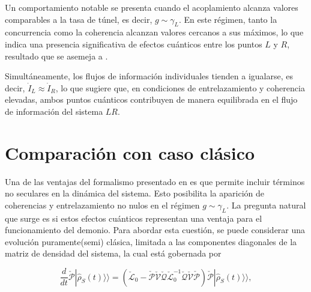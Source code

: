 
Un comportamiento notable se presenta cuando el acoplamiento alcanza valores comparables a la tasa de túnel, es decir, \( g \sim \gamma_{L} \). En este régimen, tanto la concurrencia como la coherencia alcanzan valores cercanos a sus máximos, lo que indica una presencia significativa de efectos cuánticos entre los puntos \( L \) y \( R \), resultado que se asemeja a \cite{prech2023entanglement}. 

Simultáneamente, los flujos de información individuales tienden a igualarse, es decir, \( \dot{I}_{L} \approx \dot{I}_{R} \), lo que sugiere que, en condiciones de entrelazamiento y coherencia elevadas, ambos puntos cuánticos contribuyen de manera equilibrada en el flujo de información del sistema $LR$. 


\label{sec5:demonio1}

\newpage 

\section{Comparación con caso clásico}
Una de las ventajas del formalismo presentado en \cite{potts2021thermodynamically} es que permite incluir términos no seculares en la dinámica del sistema. Esto posibilita la aparición de coherencias y entrelazamiento no nulos en el régimen \( g \sim \gamma_{L} \). La pregunta natural que surge es si estos efectos cuánticos representan una ventaja para el funcionamiento del demonio. Para abordar esta cuestión, se puede considerar una evolución puramente(semi) clásica, limitada a las componentes diagonales de la matriz de densidad del sistema, la cual está gobernada por

\begin{equation}
    \frac{d}{dt}\check{\mathcal{P}}|\hat{\rho}_{S}(t)\rangle \rangle = (\check{\mathcal{L}}_{0} - \check{\mathcal{P}}\check{\mathcal{V}}\check{\mathcal{Q}}\check{\mathcal{L}}^{-1}_{0}\check{\mathcal{Q}}\check{\mathcal{V}}\check{\mathcal{P}})\check{\mathcal{P}}|\hat{\rho}_{S}(t)\rangle \rangle, 
\label{ec5:classicalmodel}
\end{equation}

